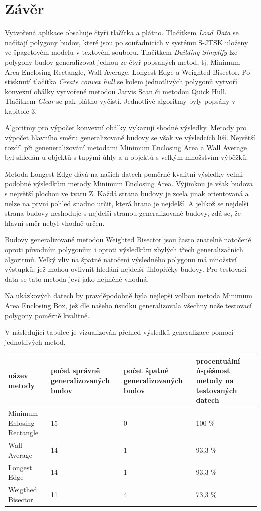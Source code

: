 \documentclass[11pt]{article}
\begin{document}
	\section{Závěr}

	Vytvořená aplikace obsahuje čtyři tlačítka a plátno. Tlačítkem \textit{Load Data} se načítají polygony budov, které jsou po souřadnicích v systému S-JTSK uloženy ve špagetovém modelu v textovém souboru. Tlačítkem \textit{Building Simplify} lze polygony budov generalizovat jednou ze čtyř popsaných metod, tj. Minimum Area Enclosing Rectangle, Wall Average, Longest Edge a Weighted Bisector. Po stisknutí tlačítka \textit{Create convex hull} se kolem jednotlivých polygonů vytvoří konvexní obálky vytvořené metodou Jarvis Scan či metodou Quick Hull. Tlačítkem \textit{Clear} se pak plátno vyčistí. Jednotlivé algoritmy byly popsány v kapitole 3.
	
	Algoritmy pro výpočet konvexní obálky vykazují shodné výsledky. Metody pro výpočet hlavního směru generalizované budovy se však ve výsledcích liší.
	Největší rozdíl při geneneralizování metodami Minimum Enclosing Area a Wall Average byl shledán u objektů s tupými úhly a u objektů s velkým množstvím výběžků.
	
	Metoda Longest Edge dává na našich datech poměrně kvalitní výsledky velmi podobné výsledkům metody Minimum Enclosing Area. Výjimkou je však budova s největší plochou ve tvaru Z. Každá strana budovy je zcela jinak orientovaná a nelze na první pohled snadno určit, která hrana je nejdelší. A jelikož se nejdelší strana budovy neshoduje s nejdelší stranou generalizované budovy, zdá se, že hlavní směr nebyl vhodně určen.
	
	Budovy generalizované metodou Weighted Bisector jsou často znatelně natočené oproti původním polygonům i oproti výsledkům zbylých třech generalizačních algoritmů. Velký vliv na špatné natočení výsledného polygonu má množství výstupků, jež mohou ovlivnit hledání nejdelší úhlopříčky budovy. Pro testovací data se tato metoda jeví jako nejméně vhodná.
	
	Na ukázkových datech by pravděpodobně byla nejlepší volbou metoda Minimum Area Enclosing Box, jež dle našeho úsudku generalizovala všechny naše testovací polygony poměrně kvalitně. 
	
	V následující tabulce je vizualizován přehled výsledků generalizace pomocí jednotlivých metod.\newline


\begin{tabular}{|m{2.5cm}|m{2.5cm}|m{2.5cm}|m{2.5cm}|}
	\hline
	název metody & počet správně generalizovaných budov & počet špatně generalizovaných budov & procentuální úspěšnost metody na testovaných datech \\ 
	\hline
	Minimum \mbox{Enlosing} Rectangle & 15 & 0 & 100 \% \\
	\hline
	Wall Average & 14 & 1 & 93,3 \% \\ 
	\hline
	Longest Edge & 14 & 1 & 93,3 \% \\ 
	\hline
	Weigthed \mbox{Bisector} & 11 & 4 & 73,3 \% \\ 
	\hline
\end{tabular}


\clearpage

		
	
\end{document}
